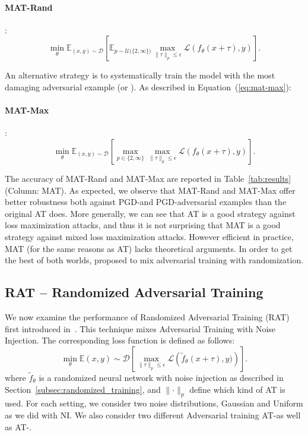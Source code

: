 \paragraph{MAT-Rand}:
\begin{equation}
    \min_{\theta}\mathbb{E}_{(x, y) \sim \mathcal{D}} \left[\mathbb{E}_{p\sim\mathcal{U}({\{2, \infty\})}} \max_{\lVert\tau\rVert_p \leq \epsilon} \mathcal{L} \left( f_{\theta}(x+\tau), y \right) \right].
    \label{eq:mat-rand}
\end{equation}

\noindent
An alternative strategy is to systematically train the model with the most damaging adversarial example (\linf or \ltwo). As described in Equation~(\ref{eq:mat-max}): 

\paragraph{MAT-Max}:
\begin{equation}
    \min_{\theta}\mathbb{E}_{(x, y) \sim \mathcal{D}} \left[ \max_{p \in \{2, \infty\}} \max_{\lVert\tau\rVert_p \leq \epsilon} \mathcal{L} \left( f_{\theta}(x+\tau), y \right) \right].
    \label{eq:mat-max}
\end{equation}

\noindent
The accuracy of MAT-Rand and MAT-Max are reported in Table~\ref{tab:results} (Column: MAT). As expected, we observe that MAT-Rand and MAT-Max offer better robustness both against PGD-\ltwo and PGD-\linf adversarial examples than the original AT does. More  generally, we can see that AT is a good strategy against loss maximization attacks, and thus it is not surprising that MAT is a good strategy against mixed loss maximization attacks. However efficient in practice, MAT (for the same reasons as AT) lacks theoretical arguments. In order to get the best of both worlds, \cite{salman2019provably} proposed to mix adversarial training with randomization.  


\subsection{RAT -- Randomized Adversarial Training}\label{subsec:randomized_adversarial_training}

We now examine the performance of Randomized Adversarial Training (RAT) first introduced in~\cite{salman2019provably}. This technique mixes Adversarial Training with Noise Injection. The corresponding loss function is defined as follows: \begin{equation}
    \min_{\theta}\mathbb{E}{(x, y) \sim \mathcal{D}} \left[ \max_{\lVert\tau\rVert_p \leq \epsilon} \mathcal{L} \left( \tilde{f}_{\theta}(x+\tau), y)  \right) \right].
\end{equation}
\noindent where $\tilde{f}_\theta$ is a randomized neural network with noise injection as described in Section~\ref{subsec:randomized_training}, and $\lVert\cdot\rVert_p$ define which kind of AT is used. For each setting, we consider two noise distributions, Gaussian and Uniform as we did with NI. We also consider two different Adversarial training AT-\linf as well as AT-\ltwo. 

